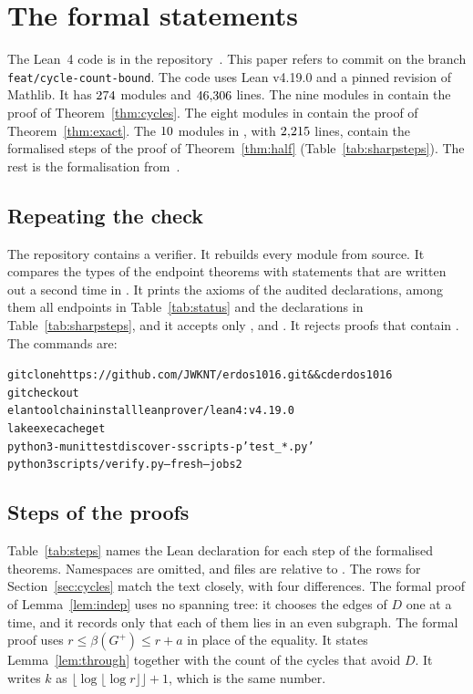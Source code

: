 \section{The formal statements}\label{app:lean}

The Lean~4 code is in the repository~\cite{Repo}. This paper refers to commit
\texttt{\leancommit} on the branch \texttt{feat/cycle-count-bound}. The code uses Lean v4.19.0 and
a pinned revision of Mathlib. It has $274$ modules and $46{,}306$ lines. The nine
modules in  contain the proof of Theorem~\ref{thm:cycles}. The eight
modules in  contain the proof of Theorem~\ref{thm:exact}. The
$10$ modules in , with $2{,}215$ lines,
contain the formalised steps of the proof of Theorem~\ref{thm:half}
(Table~\ref{tab:sharpsteps}). The rest is the formalisation from~\cite{KNT}.



\subsection{Repeating the check}

The repository contains a verifier. It rebuilds every module from source. It compares the types of
the endpoint theorems with statements that are written out a second time in
. It prints the axioms of the audited declarations, among them all
endpoints in Table~\ref{tab:status} and the declarations in Table~\ref{tab:sharpsteps}, and it
accepts only ,  and . It rejects proofs that
contain . The commands are:

{\small
\begin{alltt}
git clone https://github.com/JWKNT/erdos1016.git && cd erdos1016
git checkout \leancommit
elan toolchain install leanprover/lean4:v4.19.0
lake exe cache get
python3 -m unittest discover -s scripts -p 'test_*.py'
python3 scripts/verify.py --fresh --jobs 2
\end{alltt}}

\leancheckstatus

\subsection{Steps of the proofs}

Table~\ref{tab:steps} names the Lean declaration for each step of the formalised theorems.
Namespaces are omitted, and files are relative to . The rows for
Section~\ref{sec:cycles} match the text closely, with four differences. The formal proof of
Lemma~\ref{lem:indep} uses no spanning tree: it chooses the edges of $D$ one at a time, and it
records only that each of them lies in an even subgraph. The formal proof uses
$r\le\beta(G^{+})\le r+a$ in place of the equality. It states Lemma~\ref{lem:through} together with
the count of the cycles that avoid $D$. It writes $k$ as
$\lfloor\log\lfloor\log r\rfloor\rfloor+1$, which is the same number.

